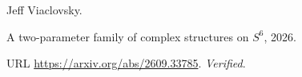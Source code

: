Jeff Viaclovsky.

\newblock A two-parameter family of complex structures on {$S^6$},
  2026{}.

\newblock URL \url{https://arxiv.org/abs/2609.33785}.
\newblock \emph{Verified}.

